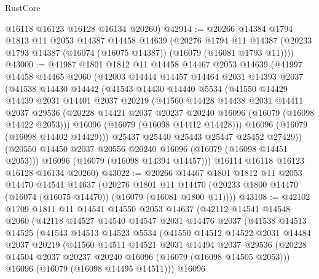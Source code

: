 \begin{lexlean}{RustCore}
\begin{coremodule}
      @16118
      @16123
      @16128
      @16134
      @20260)
@42914 := @20266
    @14384
    @1794
    @1813
    @11
    @2053
    @14387
    @14458
    @14639
    (@20276
      @1794
      @11
      @14387
      (@20233 @1793 @14387 (@16074 (@16075 @14387)) (@16079 (@16081 @1793 @11))))
@43000 := @41987
    @1801
    @1812
    @11
    @14458
    @14467
    @2053
    @14639
    (@41997
      @14458
      @14465
      @2060
      (@42003
        @14444
        @14457
        @14464
        @2031
        @14393
        @2037
        (@41538
          @14430
          @14442
          (@41543
            @14430
            @14440
            @5534
            (@41550
              @14429
              @14439
              @2031
              @14401
              @2037
              @20219
              (@41560
                @14428
                @14438
                @2031
                @14411
                @2037
                @29536
                (@20228 @14421 @2037 @20237 @20240 @16096 (@16079 (@16098 @14422 @2053)))
                @16096
                (@16079 (@16098 @14412 @14428)))
              @16096
              (@16079 (@16098 @14402 @14429)))
            @25437
            @25440
            @25443
            @25447
            @25452
            @27429))
        (@20550 @14450 @2037 @20556 @20240 @16096 (@16079 (@16098 @14451 @2053)))
        @16096
        (@16079 (@16098 @14394 @14457)))
      @16114
      @16118
      @16123
      @16128
      @16134
      @20260)
@43022 := @20266
    @14467
    @1801
    @1812
    @11
    @2053
    @14470
    @14541
    @14637
    (@20276
      @1801
      @11
      @14470
      (@20233 @1800 @14470 (@16074 (@16075 @14470)) (@16079 (@16081 @1800 @11))))
@43108 := @42102
    @1709
    @1811
    @11
    @14541
    @14550
    @2053
    @14637
    (@42112
      @14541
      @14548
      @2060
      (@42118
        @14527
        @14540
        @14547
        @2031
        @14476
        @2037
        (@41538
          @14513
          @14525
          (@41543
            @14513
            @14523
            @5534
            (@41550
              @14512
              @14522
              @2031
              @14484
              @2037
              @20219
              (@41560
                @14511
                @14521
                @2031
                @14494
                @2037
                @29536
                (@20228 @14504 @2037 @20237 @20240 @16096 (@16079 (@16098 @14505 @2053)))
                @16096
                (@16079 (@16098 @14495 @14511)))
              @16096

\end{coremodule}
\end{lexlean}
